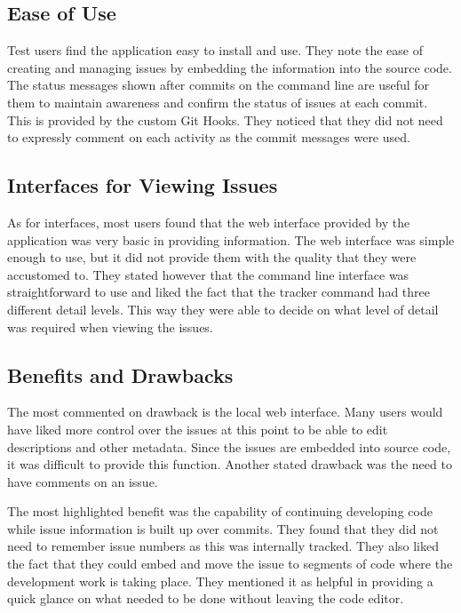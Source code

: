 \documentclass{mproj}
\begin{document}
\subsection{Ease of Use}

Test users find the application easy to install and use. They note the ease of creating and managing issues by embedding the information into the source code. The status messages shown after commits on the command line are useful for them to maintain awareness and confirm the status of issues at each commit. This is provided by the custom Git Hooks. They noticed that they did not need to expressly comment on each activity as the commit messages were used.

\subsection{Interfaces for Viewing Issues}

As for interfaces, most users found that the web interface provided by the application was very basic in providing information. The web interface was simple enough to use, but it did not provide them with the quality that they were accustomed to. They stated however that the command line interface was straightforward to use and liked the fact that the tracker command had three different detail levels. This way they were able to decide on what level of detail was required when viewing the issues.

\subsection{Benefits and Drawbacks}

The most commented on drawback is the local web interface. Many users would have liked more control over the issues at this point to be able to edit descriptions and other metadata. Since the issues are embedded into source code, it was difficult to provide this function. Another stated drawback was the need to have comments on an issue.

The most highlighted benefit was the capability of continuing developing code while issue information is built up over commits. They found that they did not need to remember issue numbers as this was internally tracked. They also liked the fact that they could embed and move the issue to segments of code where the development work is taking place. They mentioned it as helpful in providing a quick glance on what needed to be done without leaving the code editor.
\end{document}
